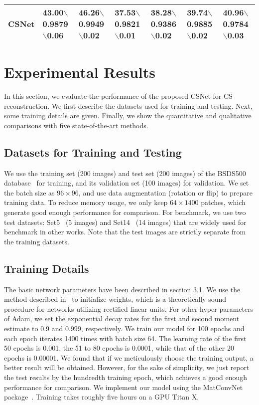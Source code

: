 \documentclass[5pt]{article}
\begin{document}
\begin{table*}[t]
\begin{tabular}{|l|l|l|l|l|l|l|}
\hline
CSNet & \textbf{43.00}$\backslash$\textbf{0.9879}$\backslash$\textbf{0.06} & 46.26$\backslash$\textbf{0.9949}$\backslash$\textbf{0.02} & 37.53$\backslash$0.9821$\backslash$\textbf{0.01} & \textbf{38.28}$\backslash$\textbf{0.9386}$\backslash$\textbf{0.02} & 39.74$\backslash$\textbf{0.9885}$\backslash$\textbf{0.02} & \textbf{40.96}$\backslash$\textbf{0.9784}$\backslash$\textbf{0.03}\\\hline
\end{tabular}
\vspace{-15pt}
\end{table*}

\section{Experimental Results}

In this section, we evaluate the performance of the proposed CSNet for CS reconstruction. We first describe the datasets used for training and testing. Next, some training details are given. Finally, we show the quantitative and qualitative comparisons with five state-of-the-art methods.

\subsection{Datasets for Training and Testing}

We use the training set (200 images) and test set (200 images) of the BSDS500 database~\cite{rf22} for training, and its validation set (100 images) for validation. We set the batch size as $96 \times 96$, and use data augmentation (rotation or flip) to prepare training data. To reduce memory usage, we only keep $64 \times 1400$ patches, which generate good enough performance for comparison. For benchmark, we use two test datasets: Set5~\cite{rf23} (5 images) and Set14~\cite{rf24} (14 images) that are widely used for benchmark in other works. Note that the test images are strictly separate from the training datasets.

\subsection{Training Details}

The basic network parameters have been described in section 3.1. We use the method described in~\cite{rf25} to initialize weights, which is a theoretically sound procedure for networks utilizing rectified linear units. For other hyper-parameters of Adam, we set the exponential decay rates for the first and second moment estimate to 0.9 and 0.999, respectively. We train our model for 100 epochs and each epoch iterates 1400 times with batch size 64. The learning rate of the first 50 epochs is 0.001, the 51 to 80 epochs is 0.0001, while that of the other 20 epochs is 0.00001. We found that if we meticulously choose the training output, a better result will be obtained. However, for the sake of simplicity, we just report the test results by the hundredth training epoch, which achieves a good enough performance for comparison. We implement our model using the MatConvNet package~\cite{rf26}. Training takes roughly five hours on a GPU Titan X.
\end{document}

